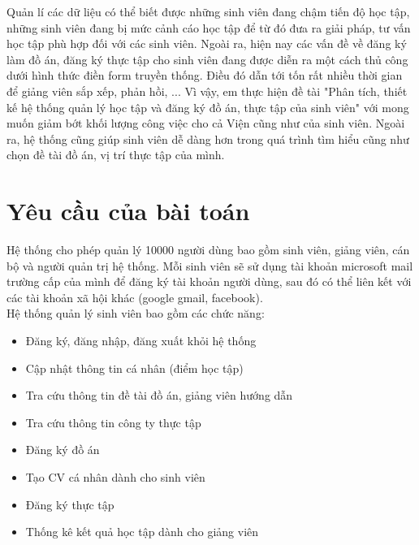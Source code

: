 Quản lí các dữ liệu có thể biết được những sinh viên đang chậm tiến độ học tập, những sinh viên đang bị mức cảnh cáo học tập để từ đó đưa ra giải pháp, tư vấn học tập phù hợp đối với các sinh viên.
Ngoài ra, hiện nay các vấn đề về đăng ký làm đồ án, đăng ký thực tập cho sinh viên đang được diễn ra một cách thủ công dưới hình thức điền form truyền thống.
Điều đó dẫn tới tốn rất nhiều thời gian để giảng viên sắp xếp, phản hồi, ... Vì vậy, em thực hiện đề tài "Phân tích, thiết kế hệ thống quản lý học tập và đăng ký đồ án, thực tập của sinh viên"
với mong muốn giảm bớt khối lượng công việc cho cả Viện cũng như của sinh viên. Ngoài ra, hệ thống cũng giúp sinh viên dễ dàng hơn trong quá trình
tìm hiểu cũng như chọn đề tài đồ án, vị trí thực tập của mình.

\section{Yêu cầu của bài toán}
Hệ thống cho phép quản lý 10000 người dùng bao gồm sinh viên, giảng viên, cán bộ và người quản trị hệ thống.
Mỗi sinh viên sẽ sử dụng tài khoản microsoft mail trường cấp của mình để đăng ký tài khoản người dùng, sau đó có thể liên kết với
các tài khoản xã hội khác (google gmail, facebook). \\

Hệ thống quản lý sinh viên bao gồm các chức năng:
\begin{itemize}
	\item Đăng ký, đăng nhập, đăng xuất khỏi hệ thống
	\item Cập nhật thông tin cá nhân (điểm học tập)
	\item Tra cứu thông tin đề tài đồ án, giảng viên hướng dẫn
	\item Tra cứu thông tin công ty thực tập
	\item Đăng ký đồ án
	\item Tạo CV cá nhân dành cho sinh viên
	\item Đăng ký thực tập
	\item Thống kê kết quả học tập dành cho giảng viên
\end{itemize}

